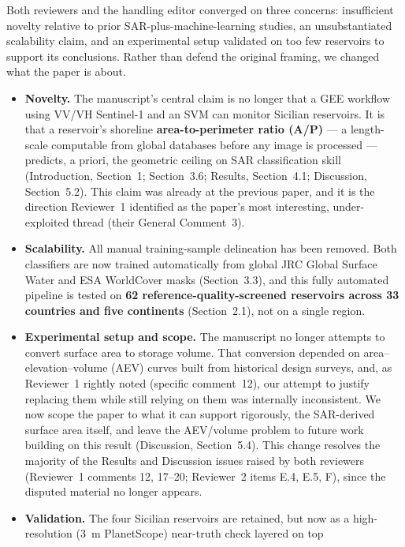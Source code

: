 \documentclass[11pt]{article}
\begin{document}
Both reviewers and the handling editor converged on three concerns:
insufficient novelty relative to prior SAR-plus-machine-learning studies,
an unsubstantiated scalability claim, and an experimental setup validated on
too few reservoirs to support its conclusions. Rather than defend the
original framing, we changed what the paper is about.

\begin{itemize}[leftmargin=1.2em]
  \item \textbf{Novelty.} The manuscript's central claim is no longer that a
  GEE workflow using VV/VH Sentinel-1 and an SVM can monitor Sicilian
  reservoirs. It is that a reservoir's shoreline \textbf{area-to-perimeter
  ratio (A/P)} --- a length-scale computable from global databases before any
  image is processed --- predicts, a priori, the geometric ceiling on SAR
  classification skill (Introduction, Section~1; Section~3.6; Results,
  Section~4.1; Discussion, Section~5.2). This claim was already at 
  the previous paper, and it is the direction Reviewer~1 identified 
  as the paper's most interesting, under-exploited
  thread (their General Comment~3).
  \item \textbf{Scalability.} All manual training-sample delineation has been
  removed. Both classifiers are now trained automatically from global JRC
  Global Surface Water and ESA WorldCover masks (Section~3.3), and this fully
  automated pipeline is tested on \textbf{62 reference-quality-screened
  reservoirs across 33 countries and five continents} (Section~2.1), not on a
  single region.
  \item \textbf{Experimental setup and scope.} The manuscript no longer
  attempts to convert surface area to storage volume. That conversion
  depended on area--elevation--volume (AEV) curves built from historical
  design surveys, and, as Reviewer~1 rightly noted (specific comment~12), our
  attempt to justify replacing them while still relying on them was
  internally inconsistent. We now scope the paper to what it can support
  rigorously, the SAR-derived surface area itself, and leave the AEV/volume
  problem to future work building on this result (Discussion,
  Section~5.4). This change resolves the majority of the Results and
  Discussion issues raised by both reviewers (Reviewer~1 comments 12, 17--20;
  Reviewer~2 items E.4, E.5, F), since the disputed material no longer
  appears.
  \item \textbf{Validation.} The four Sicilian reservoirs are retained, but
  now as a high-resolution (3~m PlanetScope) near-truth check layered on top

\end{itemize}
\end{document}
